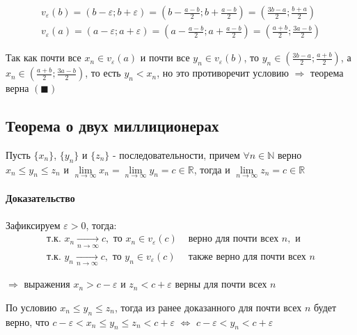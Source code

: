 \documentclass[class=article,a4paper,12pt,crop=false]{standalone}
\begin{document}
\[\begin{aligned}
  v_{\varepsilon}(b) = (b - \varepsilon; b + \varepsilon) =
  (b - \frac{a - b}{2}; b + \frac{a - b}{2}) = (\frac{3b - a}{2}; \frac{b + a}{2}) \\
  v_{\varepsilon}(a) = (a - \varepsilon; a + \varepsilon) =
  (a - \frac{a - b}{2}; a + \frac{a - b}{2}) = (\frac{a + b}{2}; \frac{3a - b}{2})
\end{aligned}\]

Так как почти все $x_n \in v_{\varepsilon}(a)$ и почти все $y_n \in v_{\varepsilon}(b)$, то
$y_n \in (\frac{3b - a}{2}; \frac{a + b}{2})$, а $x_n \in (\frac{a + b}{2}; \frac{3a - b}{2})$, то
есть $y_n < x_n$, но это противоречит условию $\Rightarrow$ теорема верна $(\blacksquare)$

\subsection{Теорема о двух миллиционерах}

Пусть $\{x_n\}$, $\{y_n\}$ и $\{z_n\}$ - последовательности, причем $\forall n \in \mathbb{N}$ верно
$x_n \leq y_n \leq z_n$ и $\lim\limits_{n \rightarrow \infty}x_n = \lim\limits_{n \rightarrow \infty}y_n = c \in \mathbb{R}$,
тогда и $\lim\limits_{n \rightarrow \infty}z_n = c \in \mathbb{R}$

\paragraph{Доказательство} Зафиксируем $\varepsilon > 0$, тогда:
\begin{equation}
  \begin{aligned}
    \text{т.к. } x_n \underset{n \rightarrow \infty}{\rightarrow} c, \text{ то } x_n \in
    v_{\varepsilon}(c)& \text{ верно для почти всех } n, \text{ и} \\
    \text{т.к. } y_n \underset{n \rightarrow \infty}{\rightarrow} c, \text{ то } y_n \in
    v_{\varepsilon}(c)& \text{ также верно для почти всех } n
  \end{aligned}
\end{equation}

$\Rightarrow$ выражения $x_n > c - \varepsilon$ и $z_n < c + \varepsilon$ верны для почти всех $n$ 

По условию $x_n \leq y_n \leq z_n$, тогда из ранее доказанного для почти всех $n$ будет верно, что
$c - \varepsilon < x_n \leq y_n \leq z_n < c + \varepsilon$ $\Leftrightarrow$
$c - \varepsilon < y_n < c + \varepsilon$
\end{document}
